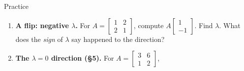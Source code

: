 \documentclass[10pt]{article}
\newcommand{\xx}{\mathbf{x}}
\begin{document}
\begin{notesbox}{Practice}
\begin{enumerate}[leftmargin=1.9em, itemsep=12pt]
        the matrix beside it. Compute $A\xx$ and read off $\lambda$.
    \begin{enumerate}[label=(\alph*), leftmargin=1.8em, itemsep=4pt]
      \item $A=\begin{bmatrix} 5 & 0 \\ 0 & 3 \end{bmatrix}$, $\xx=\begin{bmatrix} 0 \\ 1 \end{bmatrix}$ \hfill \ans{$A\xx=\begin{bsmallmatrix} 0\\3 \end{bsmallmatrix}=3\xx$; $\lambda=3$.}
      \item $A=\begin{bmatrix} 6 & 2 \\ 0 & 4 \end{bmatrix}$, $\xx=\begin{bmatrix} 1 \\ -1 \end{bmatrix}$ \hfill \ans{$A\xx=\begin{bsmallmatrix} 4\\-4 \end{bsmallmatrix}=4\xx$; $\lambda=4$.}
    \end{enumerate}
  \item \textbf{A flip: negative $\lambda$.} For $A=\begin{bmatrix} 1 & 2 \\ 2 & 1 \end{bmatrix}$,
        compute $A\begin{bmatrix} 1 \\ -1 \end{bmatrix}$. Find $\lambda$. What does the \emph{sign} of
        $\lambda$ say happened to the direction?
  \item \textbf{The $\lambda=0$ direction (§5).} For $A=\begin{bmatrix} 3 & 6 \\ 1 & 2 \end{bmatrix}$,

\end{enumerate}
\end{notesbox}
\end{document}
